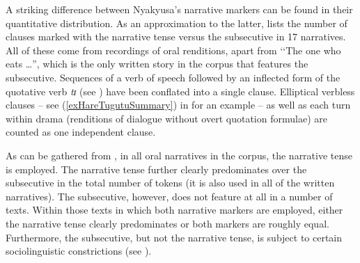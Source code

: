 A striking difference between Nyakyusa's narrative markers can be found in their quantitative distribution. As an approximation to the latter,  lists the number of clauses marked with the narrative tense versus the subsecutive in 17 narratives. All of these come from recordings of oral renditions, apart from \lq\lq The one who eats \ldots'', which is the only written story in the corpus that features the subsecutive. Sequences of a verb of speech followed by an inflected form of the quotative verb \textit{tɪ} (see ) have been conflated into a single clause. Elliptical verbless clauses  -- see (\ref{exHareTugutuSummary}) in  for an example -- as well as each turn within drama (renditions of dialogue without overt quotation formulae) are counted as one independent clause.

As can be gathered from , in all oral narratives in the corpus, the narrative tense is employed. The narrative tense further clearly predominates over the subsecutive in the total number of tokens (it is also used in all of the written narratives). The subsecutive, however, does not feature at all in a number of texts. Within those texts in which both narrative markers are employed, either the narrative tense clearly predominates or both markers are roughly equal. Furthermore, the subsecutive, but not the narrative tense, is subject to certain sociolinguistic constrictions (see ).

